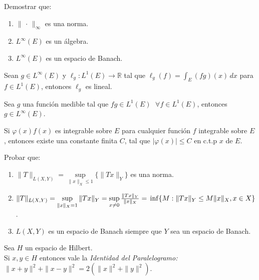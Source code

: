 \documentclass{book}
\newcommand{\rr}{\mathbb{R}}
\begin{document}
\begin{ejer}{} Demostrar que:
	\begin{enumerate}
\item $\|\, \cdot\,\|_{\infty}$ es una norma.
\item $L^{\infty}(E)$ es un álgebra.
\item $L^{\infty}(E)$ es un espacio de Banach.  
	\end{enumerate}
	\end{ejer}



\begin{ejer}{} Sean $g\in L^{\infty}(E)$ y \;\;$\ell_g:L^1(E)\rightarrow \rr$\;\; 
tal que \;\;$\ell_g(f)=\int_E (fg)(x)\,dx$\;\; para
\\ 
$f \in L^1(E)$, entonces
$\ell_g$ es lineal.
\end{ejer}


\begin{ejer}{} Sea $g$ una función medible tal que $fg\in L^1(E)$ $\;\forall f \in L^1(E)$, entonces $g \in L^{\infty}(E)$.
\end{ejer}


\begin{ejer}{}
	Si $\varphi(x) f(x)$ es integrable sobre $E$ para cualquier función $f$ integrable sobre $E$, entonces
  existe una constante finita $C$, tal que $|\varphi(x)|\leq C$ en c.t.p $x$ de $E$.
	\end{ejer}


\begin{ejer}{} Probar que: 
		\begin{enumerate}
	\item 
$\|T\|_{L(X,Y)}=\sup\limits_{\|x\|_{X}\leq 1}\{\|Tx\|_{Y}\}$
es una norma.
	\item 
 $\|T\|_{L(X,Y)}=\sup\limits_{\|x\|_{X}=1}\|Tx\|_{Y}=
\sup\limits_{x \not =0}\frac{\|Tx\|_{Y}}{\|x\|_{X}}=
\\
\inf\{M:\|Tx\|_{Y}\leq M \|x\|_{X}, x\in X\}$.
\item $L(X,Y)$ es un espacio de Banach siempre que $Y$ sea un espacio de Banach.
		\end{enumerate}
\end{ejer}
		
		
\begin{ejer}{} 
Sea $H$ un espacio de Hilbert.
 \\
 Si $x,y\in H$ entonces vale la {\it{Identidad del Paralelogramo:}}
\\
 $\|x+y\|^2+\|x-y\|^2=2(\|x\|^2+\|y\|^2). $
 \end{ejer}
 
\end{document}
